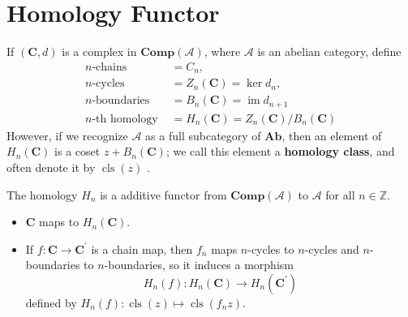 \documentclass[12pt, oneside]{book}
\begin{document}
\section{Homology Functor} %
\begin{definition}
    If $(\mathbf{C}, d)$ is a complex in $\mathbf{C o m p}(\mathcal{A})$, where $\mathcal{A}$ is an abelian category, define
    \begin{equation*}
        \begin{aligned}
            n \text {-chains }      & =C_n,                                              \\
            n \text {-cycles }      & =Z_n(\mathbf{C})=\operatorname{ker} d_n,           \\
            n \text {-boundaries }  & =B_n(\mathbf{C})=\operatorname{im} d_{n+1}         \\
            n \text {-th homology } & =H_n(\mathbf{C})=Z_n(\mathbf{C}) / B_n(\mathbf{C})
        \end{aligned}
    \end{equation*}
    However, if we recognize $\mathcal{A}$ as a full subcategory of $\mathbf{A b}$, then an element of $H_n(\mathbf{C})$ is a coset $z+B_n(\mathbf{C})$; we call this element a \textbf{homology class}, and often denote it by $\operatorname{cls}\left( z \right)$ .

\end{definition}

\begin{theorem}
    The homology $H_n$ is a additive functor from $\mathbf{C o m p}(\mathcal{A})$ to $\mathcal{A}$ for all $n \in \mathbb{Z}$.
    \begin{itemize}
        \item
              $\mathbf{C}$ maps to $H_n(\mathbf{C})$.
        \item
              If $f: \mathbf{C} \rightarrow \mathbf{C}^{\prime}$ is a chain map, then $f_n$ maps $n$-cycles to $n$-cycles and $n$-boundaries to $n$-boundaries, so it induces a morphism
              \begin{equation*}
                  H_n(f): H_n(\mathbf{C}) \rightarrow H_n\left(\mathbf{C}^{\prime}\right)
              \end{equation*}
              defined by $H_n(f): \operatorname{cls}(z) \mapsto \operatorname{cls}\left(f_n z\right) $.
    \end{itemize}
\end{theorem}
\end{document}
